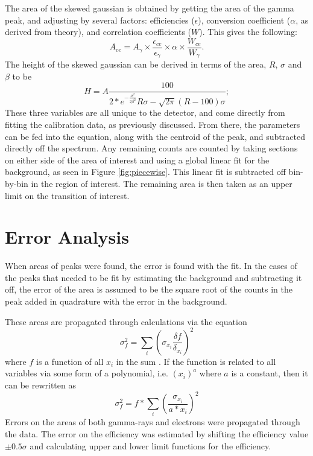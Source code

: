 

The area of the skewed gaussian is obtained by getting the area of the gamma peak, and adjusting by several factors: efficiencies ($\epsilon$), conversion coefficient ($\alpha$, as derived from theory), and correlation coefficients ($W$). This gives the following:
\begin{equation}
    A_{ce} = A_{\gamma}\times\frac{\epsilon_{ce}}{\epsilon_{\gamma}}\times\alpha\times\frac{W_{ce}}{W_{\gamma}}.
    \label{eq:subt_area_skew}
\end{equation}
The height of the skewed gaussian can be derived in terms of the area, $R$, $\sigma$ and $\beta$ to be
\begin{equation}
    H = A\frac{100}{2*e^{-\frac{\sigma^2}{2\beta^2}}R\sigma-\sqrt{2\pi}(R-100)\sigma};
    \label{eq:subt_height_skew}
\end{equation}
These three variables are all unique to the detector, and come directly from fitting the calibration data, as previously discussed. From there, the parameters can be fed into the equation, along with the centroid of the peak, and subtracted directly off the spectrum. Any remaining counts are counted by taking sections on either side of the area of interest and using a global linear fit for the background, as seen in Figure \ref{fig:piecewise}. This linear fit is subtracted off bin-by-bin in the region of interest. The remaining area is then taken as an upper limit on the transition of interest.



\section{Error Analysis}

When areas of peaks were found, the error is found with the fit. In the cases of the peaks that needed to be fit by estimating the background and subtracting it off, the error of the area is assumed to be the square root of the counts in the peak added in quadrature with the error in the background.

These areas are propagated through calculations via the equation
\begin{equation}
    \sigma_{f}^2=\sum_{i}\left(\sigma_{x_i}\frac{\delta f}{\delta_{x_i}}\right)^2
\end{equation}
where $f$ is a function of all $x_i$ in the sum \citep{bevington03:_error}. If the function is related to all variables via some form of a polynomial, i.e. $(x_i)^a$ where $a$ is a constant, then it can be rewritten as
\begin{equation}
    \sigma_{f}^2=f*\sum_{i}\left(\frac{\sigma_{x_i}}{a*x_i}\right)^2
\end{equation}
Errors on the areas of both gamma-rays and electrons were propagated through the data. The error on the efficiency was estimated by shifting the efficiency value $\pm0.5\sigma$ and calculating upper and lower limit functions for the efficiency. 


